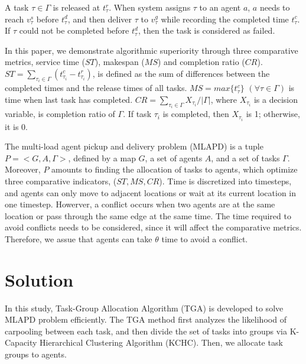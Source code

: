 \documentclass[sigconf,anonymous]{aamas}
\begin{document}
A task $\tau \in \Gamma$ is released at $t^{r}_{\tau}$. 
When system assigns $\tau$ to an agent $a$, 
$a$ needs to reach $v^{s}_{\tau}$ before $t^{d}_{\tau}$, 
and then deliver $\tau$ to $v^g_{\tau}$ while recording the completed time $t^{c}_{\tau}$. 
If $\tau$ could not be completed before $t^{d}_{\tau}$, 
then the task is considered as failed.

\begin{definition}
    In this paper, we demonstrate algorithmic superiority through three comparative metrics, 
    service time (${ST}$), makespan ($MS$) and completion ratio ($CR$). 
    $ST = \sum_{\tau_i \in \Gamma}{(t^{c}_{\tau_i} - t^{r}_{\tau_i})}$, 
    is defined as the sum of differences between the completed times and the release times of all tasks.
    $MS = max{\{t^{c}_{\tau}\}}$ $(\forall \tau \in \Gamma)$ 
    is time when last task has completed.
    $CR = {\sum_{\tau_i \in \Gamma}{X_{\tau_i}}}/{|\Gamma|}$, 
    where $X_{\tau_i}$ is a decision variable, is completion ratio of $\Gamma$. 
    If task $\tau_{i}$ is completed, then $X_{\tau_i}$ is 1; otherwise, it is 0.
    
    
\end{definition}

\begin{definition}[MLAPD]
\label{ProDfn}
    The multi-load agent pickup and delivery problem (MLAPD) is a tuple $P = <G, A, \Gamma>$, 
    defined by a map $G$, a set of agents $A$, and a set of tasks $\Gamma$. 
    Moreover, $P$ amounts to finding the allocation of tasks to agents, 
    which optimize three comparative indicators, ($ST, MS, CR$).
    Time is discretized into timesteps, and agents can only move to adjacent locations 
    or wait at its current location in one timestep.
    Howerver, a conflict occurs when two agents are at the same location or pass through the same edge at the same time.
    The time required to avoid conflicts needs to be considered, since it will affect the comparative metrics.
    Therefore, we assue that agents can take $\theta$ time to avoid a conflict.
\end{definition}
 
\section{Solution}

In this study, Task-Group Allocation Algorithm (TGA) is developed to solve MLAPD problem efficiently. 
The TGA method first analyzes the likelihood of carpooling between each task, 
and then divide the set of tasks into groups via K-Capacity Hierarchical Clustering Algorithm (KCHC). 
Then, we allocate task groups to agents.
\end{document}
